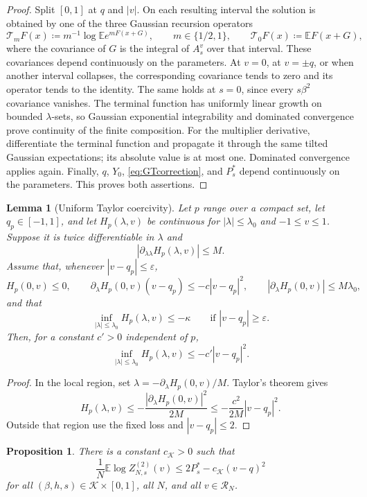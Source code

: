 \documentclass[11pt]{article}
\newtheorem{proposition}[theorem]{Proposition}
\newtheorem{lemma}[theorem]{Lemma}
\numberwithin{equation}{section}
\newcommand{\E}{\mathbb{E}}
\newcommand{\1}{\mathbf 1}
\newcommand{\cK}{\mathcal K}
\begin{document}
\begin{proof}
Split $[0,1]$ at $q$ and $|v|$.  On each resulting interval the
solution is obtained by one of the three Gaussian recursion operators
\[
 \mathcal T_mF(x)\coloneqq m^{-1}\log\E e^{mF(x+G)},
 \qquad m\in\{1/2,1\},
 \qquad
 \mathcal T_0F(x)\coloneqq\E F(x+G),
\]
where the covariance of $G$ is the integral of $A_s^v$ over that
interval.  These covariances depend continuously on the parameters.
At $v=0$, at $v=\pm q$, or when another interval collapses, the
corresponding covariance tends to zero and its operator tends to the
identity.  The same holds at $s=0$, since every $s\beta^2$ covariance
vanishes.  The terminal function has uniformly linear growth on
bounded $\lambda$-sets, so Gaussian exponential integrability and
dominated convergence prove continuity of the finite composition.
For the multiplier derivative, differentiate the terminal function
and propagate it through the same tilted Gaussian expectations; its
absolute value is at most one.  Dominated convergence applies again.
Finally, $q$, $Y_0$, \eqref{eq:GTcorrection}, and $P_s^*$ depend
continuously on the parameters.  This proves both assertions.
\end{proof}

\begin{lemma}[Uniform Taylor coercivity]
\label{lem:Taylorcoercivity}
Let $p$ range over a compact set, let $q_p\in[-1,1]$, and let
$H_p(\lambda,v)$ be continuous for $|\lambda|\le\lambda_0$ and
$-1\le v\le1$.  Suppose it is twice differentiable in $\lambda$ and
\[
 |\partial_{\lambda\lambda}H_p(\lambda,v)|\le M.
\]
Assume that, whenever $|v-q_p|\le\varepsilon$,
\[
 H_p(0,v)\le0,\qquad
 \partial_\lambda H_p(0,v)(v-q_p)
 \le-c|v-q_p|^2,
 \qquad
 |\partial_\lambda H_p(0,v)|\le M\lambda_0,
\]
and that
\[
 \inf_{|\lambda|\le\lambda_0}H_p(\lambda,v)\le-\kappa
 \qquad\text{if }|v-q_p|\ge\varepsilon.
\]
Then, for a constant $c'>0$ independent of $p$,
\[
 \inf_{|\lambda|\le\lambda_0}H_p(\lambda,v)
 \le-c'|v-q_p|^2.
\]
\end{lemma}

\begin{proof}
In the local region, set
$\lambda=-\partial_\lambda H_p(0,v)/M$.  Taylor's theorem gives
\[
 H_p(\lambda,v)
 \le-\frac{|\partial_\lambda H_p(0,v)|^2}{2M}
 \le-\frac{c^2}{2M}|v-q_p|^2.
\]
Outside that region use the fixed loss and $|v-q_p|\le2$.
\end{proof}

\begin{proposition}
\label{prop:GTcoercivity}
There is a constant $c_{\cK}>0$ such that
\begin{equation}
 \frac1N\E\log Z^{(2)}_{N,s}(v)
 \le 2P_s^*-c_{\cK}(v-q)^2
 \label{eq:GTcoercivity}
\end{equation}
for all $(\beta,h,s)\in\cK\times[0,1]$, all $N$, and all
$v\in\mathcal R_N$.
\end{proposition}
\end{document}
